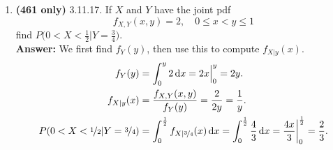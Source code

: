 \documentclass{article}
\begin{document}
\begin{enumerate}
        \item \textbf{(461 only) }3.11.17. If $X$ and $Y$ have the joint pdf
            \[f_{X,Y}(x,y) = 2, \quad 0 \leq x < y \leq 1\]
        find $P\big(0 < X < \frac{1}{2}|Y=\frac{3}{4}\big)$.\\
        \textbf{Answer: } We first find $f_Y(y)$, then use this to compute $f_{X|y}(x)$.
            \begin{align*}
                f_Y(y) &= \int_0^y 2 \dif x = 2x\Big|_0^y = 2y.\\
                f_{X|y}(x) &= \frac{f_{X,Y}(x,y)}{f_Y(y)} = \frac{2}{2y} = \frac{1}{y}.\\
                P(0<X<\nicefrac{1}{2}|Y=\nicefrac{3}{4}) &= \int_0^\frac{1}{2} f_{X|\nicefrac{3}{4}} (x) \dif x = \int_0^\frac{1}{2} \frac{4}{3} \dif x = \frac{4x}{3}\bigg|_0^\frac{1}{2} = \frac{2}{3}.
            \end{align*}
    \end{enumerate}
\end{document}
